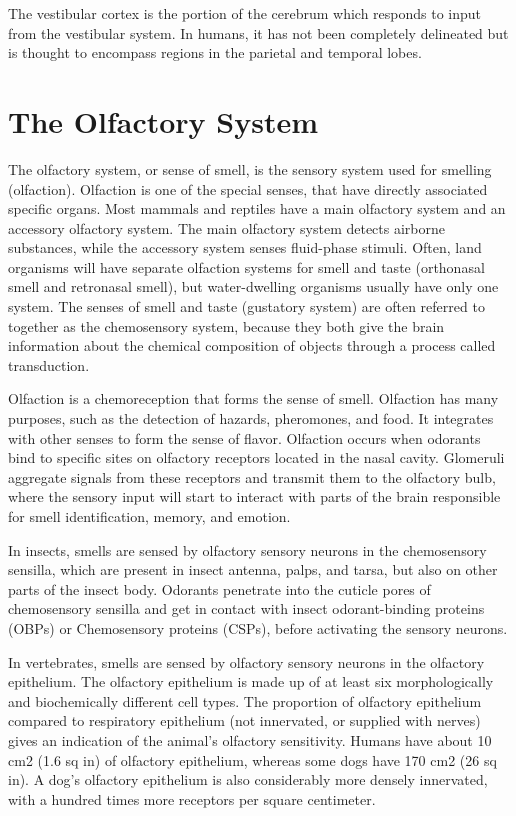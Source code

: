 \documentclass[]{book}
\begin{document}
The vestibular cortex is the portion of the cerebrum which responds to input from the vestibular system. In humans, it has not been completely delineated but is thought to encompass regions in the parietal and temporal lobes.

\hypertarget{the-olfactory-system}{%
\chapter{The Olfactory System}\label{the-olfactory-system}}

The olfactory system, or sense of smell, is the sensory system used for smelling (olfaction). Olfaction is one of the special senses, that have directly associated specific organs. Most mammals and reptiles have a main olfactory system and an accessory olfactory system. The main olfactory system detects airborne substances, while the accessory system senses fluid-phase stimuli. Often, land organisms will have separate olfaction systems for smell and taste (orthonasal smell and retronasal smell), but water-dwelling organisms usually have only one system. The senses of smell and taste (gustatory system) are often referred to together as the chemosensory system, because they both give the brain information about the chemical composition of objects through a process called transduction.

Olfaction is a chemoreception that forms the sense of smell. Olfaction has many purposes, such as the detection of hazards, pheromones, and food. It integrates with other senses to form the sense of flavor. Olfaction occurs when odorants bind to specific sites on olfactory receptors located in the nasal cavity. Glomeruli aggregate signals from these receptors and transmit them to the olfactory bulb, where the sensory input will start to interact with parts of the brain responsible for smell identification, memory, and emotion.

In insects, smells are sensed by olfactory sensory neurons in the chemosensory sensilla, which are present in insect antenna, palps, and tarsa, but also on other parts of the insect body. Odorants penetrate into the cuticle pores of chemosensory sensilla and get in contact with insect odorant-binding proteins (OBPs) or Chemosensory proteins (CSPs), before activating the sensory neurons.

In vertebrates, smells are sensed by olfactory sensory neurons in the olfactory epithelium. The olfactory epithelium is made up of at least six morphologically and biochemically different cell types. The proportion of olfactory epithelium compared to respiratory epithelium (not innervated, or supplied with nerves) gives an indication of the animal's olfactory sensitivity. Humans have about 10 cm2 (1.6 sq in) of olfactory epithelium, whereas some dogs have 170 cm2 (26 sq in). A dog's olfactory epithelium is also considerably more densely innervated, with a hundred times more receptors per square centimeter.
\end{document}
